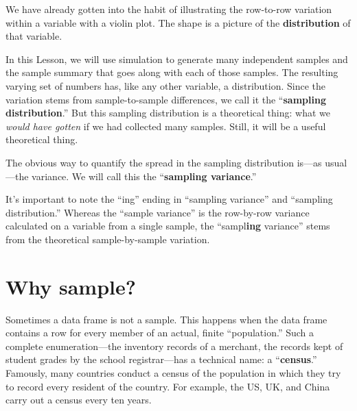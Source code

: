\documentclass[
  letterpaper,
  DIV=11,
  numbers=noendperiod,
  oneside]{scrreprt}
\begin{document}
\begin{tcolorbox}[enhanced jigsaw, colbacktitle=quarto-callout-note-color!10!white, breakable, opacitybacktitle=0.6, colback=white, left=2mm, arc=.35mm, colframe=quarto-callout-note-color-frame, coltitle=black, toprule=.15mm, opacityback=0, leftrule=.75mm, bottomtitle=1mm, toptitle=1mm, titlerule=0mm, title=\textcolor{quarto-callout-note-color}{\faInfo}\hspace{0.5em}{Sampling distribution and sampling variance}, rightrule=.15mm, bottomrule=.15mm]

We have already gotten into the habit of illustrating the row-to-row
variation within a variable with a violin plot. The shape is a picture
of the \textbf{distribution} of that variable.

In this Lesson, we will use simulation to generate many independent
samples and the sample summary that goes along with each of those
samples. The resulting varying set of numbers has, like any other
variable, a distribution. Since the variation stems from
sample-to-sample differences, we call it the ``\textbf{sampling
distribution}.'' But this sampling distribution is a theoretical thing:
what we \emph{would have gotten} if we had collected many samples.
Still, it will be a useful theoretical thing.

The obvious way to quantify the spread in the sampling distribution
is---as usual---the variance. We will call this the ``\textbf{sampling
variance}.''

It's important to note the ``ing'' ending in ``sampling variance'' and
``sampling distribution.'' Whereas the ``sample variance'' is the
row-by-row variance calculated on a variable from a single sample, the
``sampl\textbf{ing} variance'' stems from the theoretical
sample-by-sample variation.

\end{tcolorbox}

\hypertarget{why-sample}{%
\section{Why sample?}\label{why-sample}}

Sometimes a data frame is not a sample. This happens when the data frame
contains a row for every member of an actual, finite ``population.''
Such a complete enumeration---the inventory records of a merchant, the
records kept of student grades by the school registrar---has a technical
name: a ``\textbf{census}.'' Famously, many countries conduct a census
of the population in which they try to record every resident of the
country. For example, the US, UK, and China carry out a census every ten
years.
\end{document}
